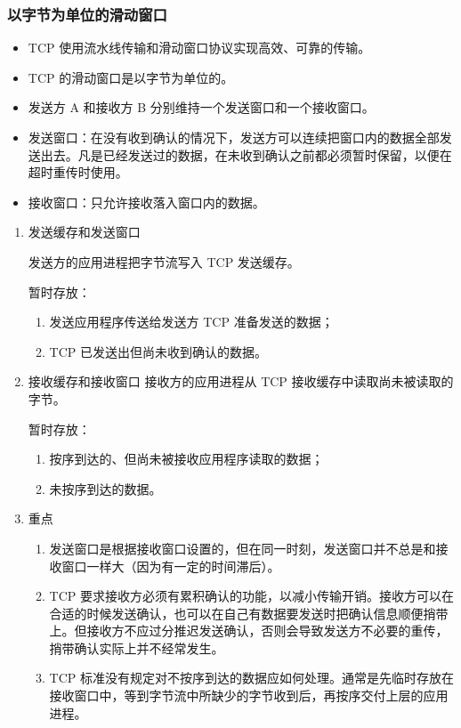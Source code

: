 \documentclass[11pt]{article}
\begin{document}
\subsubsection{以字节为单位的滑动窗口}
\label{sec:orgd30fe68}
\begin{itemize}
\item TCP 使用流水线传输和滑动窗口协议实现高效、可靠的传输。
\item TCP 的滑动窗口是以字节为单位的。
\item 发送方 A 和接收方 B 分别维持一个发送窗口和一个接收窗口。
\item 发送窗口：在没有收到确认的情况下，发送方可以连续把窗口内的数据全部发送出去。凡是已经发送过的数据，在未收到确认之前都必须暂时保留，以便在超时重传时使用。
\item 接收窗口：只允许接收落入窗口内的数据。
\end{itemize}
\begin{enumerate}
\item 发送缓存和发送窗口
\label{sec:orgbeadcb7}

发送方的应用进程把字节流写入 TCP 发送缓存。

暂时存放：
\begin{enumerate}
\item 发送应用程序传送给发送方 TCP 准备发送的数据；
\item TCP 已发送出但尚未收到确认的数据。
\end{enumerate}
\item 接收缓存和接收窗口
\label{sec:orgc7b127c}
接收方的应用进程从 TCP 接收缓存中读取尚未被读取的字节。

暂时存放：
\begin{enumerate}
\item 按序到达的、但尚未被接收应用程序读取的数据；
\item 未按序到达的数据。
\end{enumerate}
\item 重点
\label{sec:org17c614f}
\begin{enumerate}
\item 发送窗口是根据接收窗口设置的，但在同一时刻，发送窗口并不总是和接收窗口一样大（因为有一定的时间滞后）。
\item TCP 要求接收方必须有累积确认的功能，以减小传输开销。接收方可以在合适的时候发送确认，也可以在自己有数据要发送时把确认信息顺便捎带上。但接收方不应过分推迟发送确认，否则会导致发送方不必要的重传，捎带确认实际上并不经常发生。
\item TCP 标准没有规定对不按序到达的数据应如何处理。通常是先临时存放在接收窗口中，等到字节流中所缺少的字节收到后，再按序交付上层的应用进程。
\end{enumerate}
\end{enumerate}
\end{document}
